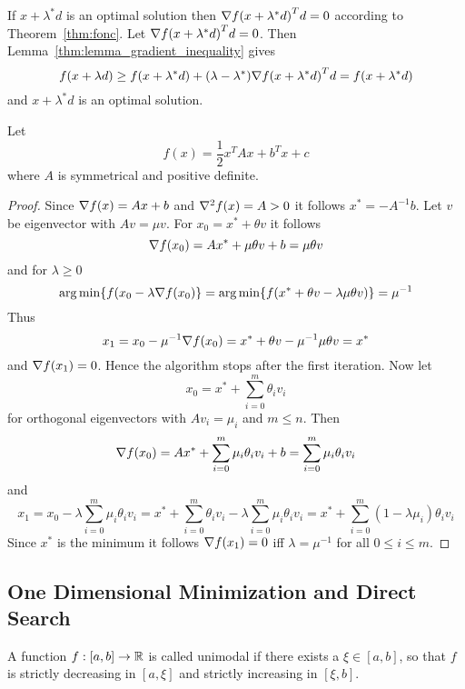 \proof{}
If  \( x + \lambda^* d \) is an optimal solution then \( \nabla {f(x + \lambda^* d)}^T d = 0 \)
according to Theorem~\ref{thm:fonc}.
Let \( \nabla {f(x + \lambda^* d)}^T d = 0 \). Then Lemma~\ref{thm:lemma_gradient_inequality} gives
\[
    f(x + \lambda d) \ge f(x + \lambda^* d) + (\lambda - \lambda^*) \nabla {f(x + \lambda^* d)}^T d
    = f(x + \lambda^* d)
\]
and \( x + \lambda^* d \) is an optimal solution.
\bigskip


\begin{exercise}
    Let
    \[
        f(x) = \frac{1}{2} x^T{A}x + b^T x + c
    \]
    where \( A \) is symmetrical and positive definite.
\end{exercise}

\begin{proof}
    Since \( \nabla {f(x)} = Ax + b \) and \( \nabla^2 {f(x)} = A > 0 \) it follows \( x^* = -A^{-1}b \).
    Let \( v \) be eigenvector with \( Av = \mu v \). For \( x_0 = x^* + \theta v \) it follows
    \[
        \nabla {f(x_0)} = Ax^* + \mu \theta v + b = \mu \theta v
    \]
    and for \(\lambda \ge 0 \)
    \[
        \operatorname*{arg\,min} \{ f(x_0 - \lambda \nabla f(x_0) \} =
        \operatorname*{arg\,min} \{ f(x^* + \theta v - \lambda \mu \theta v)\} = \mu^{-1}
    \]
    Thus
    \[
        x_1 = x_0 - \mu^{-1} \nabla f(x_0) = x^* + \theta v - \mu^{-1} \mu \theta v = x^*
    \]
    and \( \nabla {f(x_1)} = 0 \). Hence the algorithm stops after the first iteration.
    Now let
    \[
        x_0 = x^* + \sum_{i=0}^m \theta_i v_i
    \]
    for orthogonal eigenvectors with \( Av_i = \mu_i\) and \( m \le n \). Then
    \[
        \nabla {f(x_0)} = Ax^* + \sum_{i=0}^m \mu_i \theta_i v_i + b = \sum_{i=0}^m \mu_i \theta_i v_i
    \]
    and
    \[
        x_1 = x_0 - \lambda \sum_{i=0}^m \mu_i \theta_i v_i
        = x^* + \sum_{i=0}^m \theta_i v_i - \lambda \sum_{i=0}^m \mu_i \theta_i v_i
        = x^* + \sum_{i=0}^m (1 - \lambda \mu_i) \theta_i v_i
    \]
    Since \( x^* \) is the minimum it follows \( \nabla {f(x_1)} = 0 \) iff \( \lambda = \mu^{-1} \)
    for all \( 0 \le i \le m \).
\end{proof}
\bigskip



\subsection{One Dimensional Minimization and Direct Search}
\bigskip


\begin{definition}\label{def:unimodal_fnc}
    A function \( f : [a,b] \to \mathbb{R} \) is called unimodal if there exists a \( \xi \in [a,b] \), so that
    \( f \) is strictly decreasing in \( [a, \xi] \) and strictly increasing in \( [\xi, b] \).
\end{definition}
\bigskip

